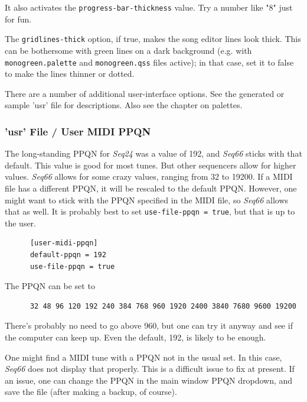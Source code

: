    It also activates the \texttt{progress-bar-thickness} value.
   Try a number like "8" just for fun.

   The \texttt{gridlines-thick} option, if true, makes the song
   editor lines look thick.
   This can be bothersome with green lines on a dark background
   (e.g. with \texttt{monogreen.palette} and \texttt{monogreen.qss}
   files active); in that case, set it to false to make the lines thinner
   or dotted.

   There are a number of additional user-interface options.  See the generated
   or sample 'usr' file for descriptions.  Also see the chapter on palettes.

\subsubsection{'usr' File / User MIDI PPQN}
\label{subsubsec:usr_file_user_midi_ppqn}

   The long-standing PPQN for \textsl{Seq24} was a value of 192, and
   \textsl{Seq66} sticks with that default.
   This value is good for most tunes. But other sequencers allow for higher
   values. \textsl{Seq66} allows for some crazy values, ranging from
   32 to 19200.  If a MIDI file has a different PPQN, it will be rescaled to
   the default PPQN.  However, one might want to stick with the PPQN
   specified in the MIDI file, so \textsl{Seq66} allows that as well.
   It is probably best to set \texttt{use-file-ppqn = true}, but that is
   up to the user.

   \begin{verbatim}
      [user-midi-ppqn]
      default-ppqn = 192
      use-file-ppqn = true
   \end{verbatim}

   The PPQN can be set to

   \begin{verbatim}
      32 48 96 120 192 240 384 768 960 1920 2400 3840 7680 9600 19200
   \end{verbatim}

   There's probably no need to go above 960, but one can try it anyway and see
   if the computer can keep up. Even the default, 192, is likely to be enough.

   One might find a MIDI tune with a PPQN not in the usual set.
   In this case, \textsl{Seq66} does not display that properly.
   This is a difficult issue to fix at present. If an issue, one
   can change the PPQN in the main window PPQN dropdown, and save the
   file (after making a backup, of course).


